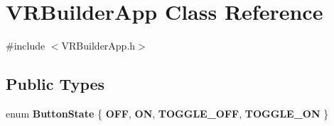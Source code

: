 \hypertarget{class_v_r_builder_app}{
\section{VRBuilderApp Class Reference}
\label{class_v_r_builder_app}
}


{\ttfamily \#include $<$VRBuilderApp.h$>$}\subsection*{Public Types}
\begin{DoxyCompactItemize}
\item 
enum {\bfseries ButtonState} \{ {\bfseries OFF}, 
{\bfseries ON}, 
{\bfseries TOGGLE\_\-OFF}, 
{\bfseries TOGGLE\_\-ON}
 \}
\end{DoxyCompactItemize}
